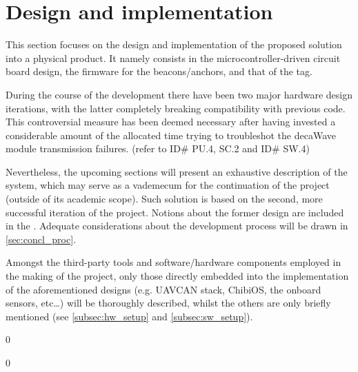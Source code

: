 \chapter{Design and implementation}\label{ch:design}

This section focuses on the design and implementation of the proposed solution into a physical product.
It namely consists in the microcontroller-driven circuit board design, the firmware for the beacons/anchors, and that of the tag.

During the course of the development there have been two major hardware design iterations, with the latter completely breaking compatibility with previous code.
This controversial measure has been deemed necessary after having invested a considerable amount of the allocated time trying to troubleshot the decaWave module transmission failures. (refer to  ID\# PU.4, SC.2 and  ID\# SW.4)

Nevertheless, the upcoming sections will present an exhaustive description of the system, which may serve as a vademecum for the continuation of the project (outside of its academic scope).
Such solution is based on the second, more successful iteration of the project.
Notions about the former design are included in the .
Adequate considerations about the development process will be drawn in \autoref{sec:concl_proc}.

Amongst the third-party tools and software/hardware components employed in the making of the project, only those directly embedded into the implementation of the aforementioned designs (e.g. UAVCAN stack, ChibiOS, the onboard sensors, etc\dots) will be thoroughly described, whilst the others are only briefly mentioned (see \autoref{subsec:hw_setup} and \autoref{subsec:sw_setup}).

{0}

{0}
